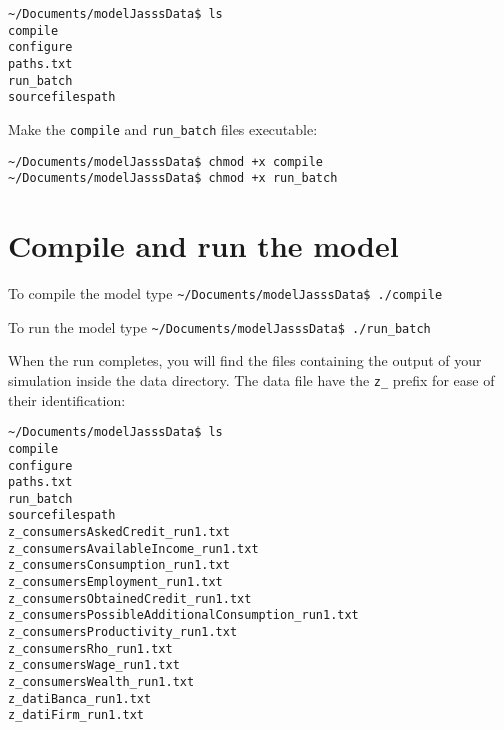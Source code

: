 \documentclass{article}
\begin{document}
\vskip2mm
\noindent\verb+~/Documents/modelJasssData$ +\color{red}\verb+ls+ \color{blue}\\
\verb+compile+\\ \color{green}
\verb+configure+\\ \color{blue}
\verb+paths.txt+ \\
\verb+run_batch+ \\
\verb+sourcefilespath+
\color{black}

\vskip2mm
Make the \verb+compile+ and \verb+run_batch+ files executable:

\vskip2mm
\noindent\verb+~/Documents/modelJasssData$ +\color{red}\verb|chmod +x compile| \color{black}\\
\verb+~/Documents/modelJasssData$ +\color{red}\verb|chmod +x run_batch| \color{black}
\vskip2mm

\section{Compile and run the model}

To compile the model type
\vskip2mm
\noindent\verb+~/Documents/modelJasssData$ +\color{red}\verb|./compile| \color{black}
\vskip2mm

To run the model type
\vskip2mm
\noindent\verb+~/Documents/modelJasssData$ +\color{red}\verb|./run_batch| \color{black}
\vskip2mm

When the run completes, you will find the files containing the output of your simulation inside the data directory.
The data file have the \verb+z_+ prefix for ease of their identification: 

\vskip2mm
\noindent\verb+~/Documents/modelJasssData$ +\color{red}\verb|ls| \\ \color{green}
\verb+compile+ \\
\verb+configure+ \\ \color{blue}
\verb+paths.txt+ \\ \color{green}
\verb+run_batch+ \\ \color{blue}
\verb+sourcefilespath+ \\
\verb+z_consumersAskedCredit_run1.txt+ \\
\verb+z_consumersAvailableIncome_run1.txt+ \\
\verb+z_consumersConsumption_run1.txt+ \\
\verb+z_consumersEmployment_run1.txt+ \\
\verb+z_consumersObtainedCredit_run1.txt+ \\
\verb+z_consumersPossibleAdditionalConsumption_run1.txt+ \\
\verb+z_consumersProductivity_run1.txt+ \\
\verb+z_consumersRho_run1.txt+ \\
\verb+z_consumersWage_run1.txt+ \\
\verb+z_consumersWealth_run1.txt+ \\
\verb+z_datiBanca_run1.txt+ \\
\verb+z_datiFirm_run1.txt+ \\
\vskip2mm
\color{black}
\end{document}
